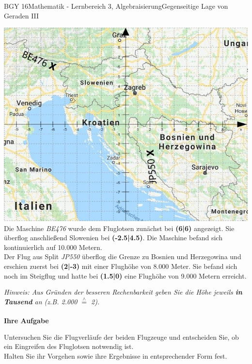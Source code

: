 \documentclass[oneside,openany,headings=optiontotoc,11pt,numbers=noenddot]{scrreprt}
\begin{document}
	\begin{worksheet}{BGY 16}{Mathematik - Lernbereich 3, Algebraisierung}{Gegenseitige Lage von Geraden III}
		
		\begin{framed}
		\noindent
		\includegraphics[scale=0.73]{Bilder/KroatienKoordFluge.jpg}\\
		Die Maschine \textit{BE476} wurde dem Fluglotsen zunächst bei \textbf{(6|6)} angezeigt. Sie überflog anschließend Slowenien bei \textbf{(-2.5|4.5)}. Die Maschine befand sich kontinuierlich auf 10.000 Metern.\\
		Der Flug aus Split \textit{JP550} überflog die Grenze zu Bosnien und Herzegowina und erschien zuerst bei \textbf{(2|-3)} mit einer Flughöhe von 8.000 Meter. Sie befand sich noch im Steigflug und hatte bei \textbf{(1.5|0)} eine Flughöhe von 9.000 Metern erreicht.\\
		\par
		\small{\textit{Hinweis: Aus Gründen der besseren Rechenbarkeit geben Sie die Höhe jeweils \textbf{in Tausend} an (z.B. 2.000 \(\overset{\wedge}{=}\) 2).}}\\
		\hdashrule[0.5ex][x]{\textwidth}{0.1mm}{8mm 2pt}\\
		\Large{\textbf{Ihre Aufgabe}}
		\normalsize
		\par\bigskip\noindent
		Untersuchen Sie die Flugverläufe der beiden Flugzeuge und entscheiden Sie, ob ein Eingreifen des Fluglotsen notwendig ist.\\
		Halten Sie ihr Vorgehen sowie ihre Ergebnisse in entsprechender Form fest.
		\end{framed}
	\end{worksheet}
\end{document}
